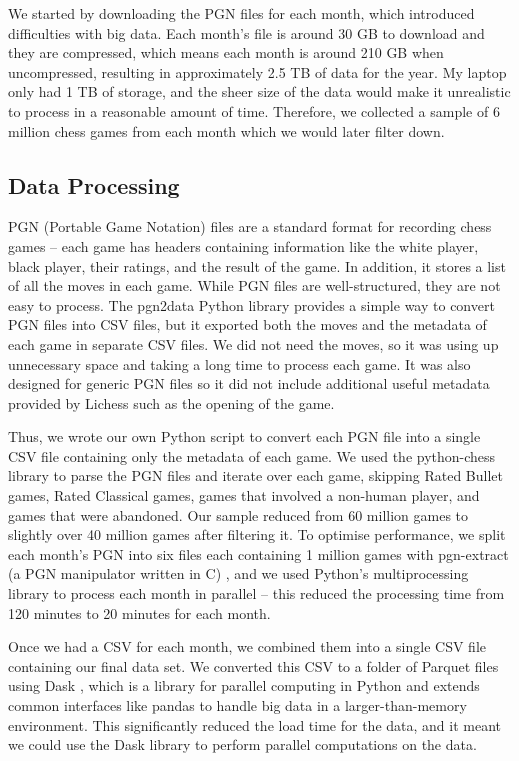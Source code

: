 \documentclass[a4paper, 11pt]{article}
\begin{document}
We started by downloading the PGN files for each month, which introduced difficulties with big data. Each month's file is around 30 GB to download and they are compressed, which means each month is around 210 GB when uncompressed, resulting in approximately 2.5 TB of data for the year. My laptop only had 1 TB of storage, and the sheer size of the data would make it unrealistic to process in a reasonable amount of time. Therefore, we collected a sample of 6 million chess games from each month which we would later filter down.

\subsection{Data Processing}
PGN (Portable Game Notation) files are a standard format for recording chess games -- each game has headers containing information like the white player, black player, their ratings, and the result of the game. In addition, it stores a list of all the moves in each game. While PGN files are well-structured, they are not easy to process. The pgn2data Python library \cite{pgn2dataGitHub} provides a simple way to convert PGN files into CSV files, but it exported both the moves and the metadata of each game in separate CSV files. We did not need the moves, so it was using up unnecessary space and taking a long time to process each game. It was also designed for generic PGN files so it did not include additional useful metadata provided by Lichess such as the opening of the game.

Thus, we wrote our own Python script to convert each PGN file into a single CSV file containing only the metadata of each game. We used the python-chess library to parse the PGN files and iterate over each game, skipping Rated Bullet games, Rated Classical games, games that involved a non-human player, and games that were abandoned. Our sample reduced from 60 million games to slightly over 40 million games after filtering it. To optimise performance, we split each month's PGN into six files each containing 1 million games with pgn-extract (a PGN manipulator written in C) \cite{pgnExtractGitHub}, and we used Python's multiprocessing library to process each month in parallel -- this reduced the processing time from 120 minutes to 20 minutes for each month.

Once we had a CSV for each month, we combined them into a single CSV file containing our final data set. We converted this CSV to a folder of Parquet files using Dask \cite{dask}, which is a library for parallel computing in Python and extends common interfaces like pandas \cite{pandas} to handle big data in a larger-than-memory environment. This significantly reduced the load time for the data, and it meant we could use the Dask library to perform parallel computations on the data.
\end{document}
